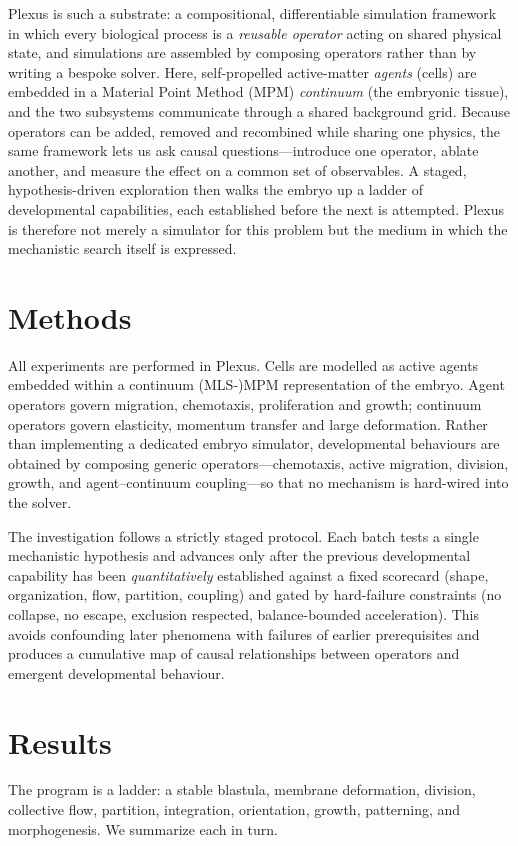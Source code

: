 \documentclass[11pt]{article}
\begin{document}
Plexus is such a substrate: a compositional, differentiable simulation framework in which every
biological process is a \emph{reusable operator} acting on shared physical state, and simulations are
assembled by composing operators rather than by writing a bespoke solver. Here, self-propelled
active-matter \emph{agents} (cells) are embedded in a Material Point Method (MPM) \emph{continuum} (the
embryonic tissue), and the two subsystems communicate through a shared background grid. Because
operators can be added, removed and recombined while sharing one physics, the same framework lets us ask
causal questions---introduce one operator, ablate another, and measure the effect on a common set of
observables. A staged, hypothesis-driven exploration then walks the embryo up a ladder of developmental
capabilities, each established before the next is attempted. Plexus is therefore not merely a simulator
for this problem but the medium in which the mechanistic search itself is expressed.

\section{Methods}
All experiments are performed in Plexus. Cells are modelled as active agents embedded within a continuum
(MLS-)MPM representation of the embryo. Agent operators govern migration, chemotaxis, proliferation and
growth; continuum operators govern elasticity, momentum transfer and large deformation. Rather than
implementing a dedicated embryo simulator, developmental behaviours are obtained by composing generic
operators---chemotaxis, active migration, division, growth, and agent--continuum coupling---so that no
mechanism is hard-wired into the solver.

The investigation follows a strictly staged protocol. Each batch tests a single mechanistic hypothesis
and advances only after the previous developmental capability has been \emph{quantitatively} established
against a fixed scorecard (shape, organization, flow, partition, coupling) and gated by hard-failure
constraints (no collapse, no escape, exclusion respected, balance-bounded acceleration). This avoids
confounding later phenomena with failures of earlier prerequisites and produces a cumulative map of
causal relationships between operators and emergent developmental behaviour.

\section{Results}
The program is a ladder: a stable blastula, membrane deformation, division, collective flow, partition,
integration, orientation, growth, patterning, and morphogenesis. We summarize each in turn.
\end{document}

